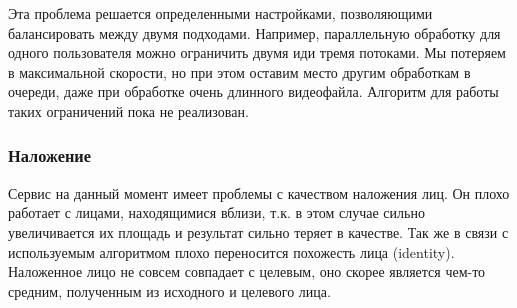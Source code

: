 Эта проблема решается определенными настройками, позволяющими балансировать между двумя подходами. Например, параллельную обработку для одного пользователя можно ограничить двумя иди тремя потоками. Мы потеряем в максимальной скорости, но при этом оставим место другим обработкам в очереди, даже при обработке очень длинного видеофайла. Алгоритм для работы таких ограничений пока не реализован.

\subsubsection*{Наложение}

Сервис на данный момент имеет проблемы с качеством наложения лиц. Он плохо работает с лицами, находящимися вблизи, т.к. в этом случае сильно увеличивается их площадь и результат сильно теряет в качестве.
Так же в связи с используемым алгоритмом плохо переносится похожесть лица (identity). Наложенное лицо не совсем совпадает с целевым, оно скорее является чем-то средним, полученным из исходного и целевого лица. 